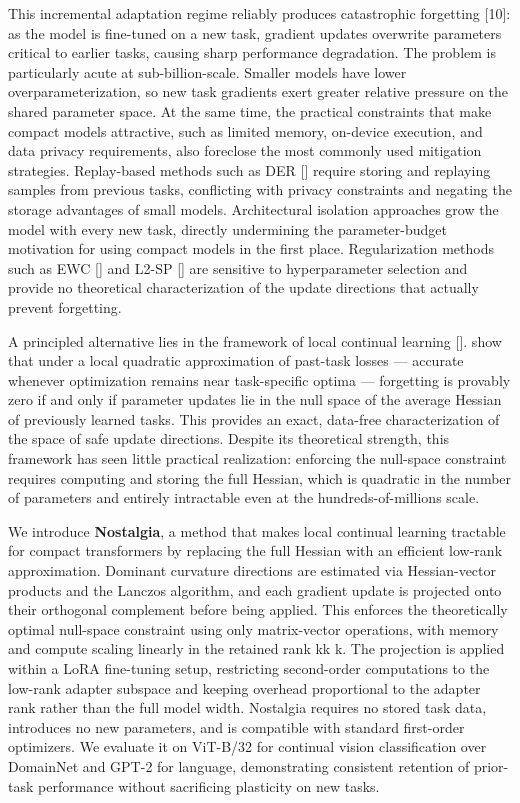 This incremental adaptation regime reliably produces catastrophic forgetting [10]: as the model is fine-tuned on a new task, gradient updates overwrite parameters critical to earlier tasks, causing sharp performance degradation. The problem is particularly acute at sub-billion-scale. Smaller models have lower overparameterization, so new task gradients exert greater relative pressure on the shared parameter space. At the same time, the practical constraints that make compact models attractive, such as limited memory, on-device execution, and data privacy requirements, also foreclose the most commonly used mitigation strategies. Replay-based methods such as DER [\cite{buzzega2020darkexperiencegeneralcontinual}] require storing and replaying samples from previous tasks, conflicting with privacy constraints and negating the storage advantages of small models. Architectural isolation approaches grow the model with every new task, directly undermining the parameter-budget motivation for using compact models in the first place. Regularization methods such as EWC [\cite{Kirkpatrick_2017}] and L2-SP [\cite{li2020baseline}] are sensitive to hyperparameter selection and provide no theoretical characterization of the update directions that actually prevent forgetting.

A principled alternative lies in the framework of local continual learning [\cite{lanzillotta2024local}]. show that under a local quadratic approximation of past-task losses — accurate whenever optimization remains near task-specific optima — forgetting is provably zero if and only if parameter updates lie in the null space of the average Hessian of previously learned tasks. This provides an exact, data-free characterization of the space of safe update directions. Despite its theoretical strength, this framework has seen little practical realization: enforcing the null-space constraint requires computing and storing the full Hessian, which is quadratic in the number of parameters and entirely intractable even at the hundreds-of-millions scale.

We introduce \textbf{Nostalgia}, a method that makes local continual learning tractable for compact transformers by replacing the full Hessian with an efficient low-rank approximation. Dominant curvature directions are estimated via Hessian-vector products and the Lanczos algorithm, and each gradient update is projected onto their orthogonal complement before being applied. This enforces the theoretically optimal null-space constraint using only matrix-vector operations, with memory and compute scaling linearly in the retained rank kk
k. The projection is applied within a LoRA fine-tuning setup, restricting second-order computations to the low-rank adapter subspace and keeping overhead proportional to the adapter rank rather than the full model width. Nostalgia requires no stored task data, introduces no new parameters, and is compatible with standard first-order optimizers. We evaluate it on ViT-B/32 for continual vision classification over DomainNet and GPT-2 for language, demonstrating consistent retention of prior-task performance without sacrificing plasticity on new tasks.

